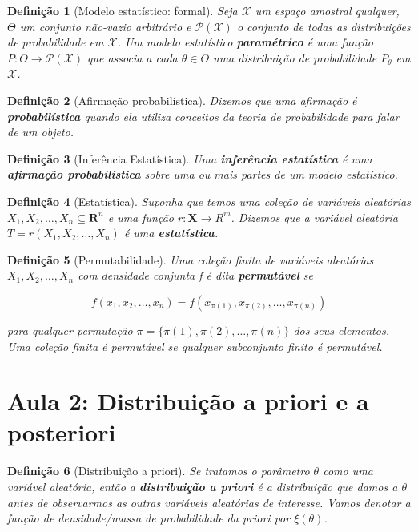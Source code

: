 \documentclass{article}
\newtheorem{definition}{Definição}
\begin{document}
\begin{definition}[Modelo estatístico: formal]
Seja $\mathcal{X}$ um espaço amostral qualquer, $\Theta$ um conjunto não-vazio arbitrário e $\mathcal{P(X)}$ o conjunto de todas as distribuições de probabilidade em $\mathcal{X}$. Um modelo estatístico \textbf{paramétrico} é uma função $P: \Theta \rightarrow \mathcal{P(X)}$ que associa a cada $\theta \in \Theta$ uma distribuição de probabilidade $P_\theta$ em $\mathcal{X}$.
\end{definition}

\begin{definition}[Afirmação probabilística]
Dizemos que uma afirmação é \textbf{probabilística} quando ela utiliza conceitos da teoria de probabilidade para falar de um objeto.
\end{definition}

\begin{definition}[Inferência Estatística]
Uma \textbf{inferência estatística} é uma \textbf{afirmação probabilística} sobre uma ou mais partes de um modelo estatístico.
\end{definition}

\begin{definition}[Estatística]
Suponha que temos uma coleção de variáveis aleatórias $X_1, X_2, \ldots, X_n \subseteq \mathbf{R}^n$ e uma função $r: \mathbf{X} \rightarrow R^m$. Dizemos que a variável aleatória $T = r(X_1, X_2, \ldots, X_n)$ é uma \textbf{estatística}.
\end{definition}

\begin{definition}[Permutabilidade]
Uma coleção finita de variáveis aleatórias $X_1, X_2, \ldots, X_n$ com densidade conjunta f é dita \textbf{permutável} se

\begin{equation}
f(x_1, x_2, \ldots, x_n) = f(x_{\pi(1)}, x_{\pi(2)}, \ldots, x_{\pi(n)})
\end{equation}

para qualquer permutação $\pi = \{\pi(1), \pi(2), \ldots, \pi(n)\}$ dos seus elementos. Uma coleção finita é permutável se qualquer subconjunto finito é permutável.
\end{definition}

\section*{Aula 2:  Distribuição a priori e a posteriori}
\label{s2}
\begin{definition}[Distribuição a priori]
Se tratamos o parâmetro $\theta$ como uma variável aleatória, então a \textbf{distribuição a priori} é a distribuição que damos a $\theta$ antes de observarmos as outras variáveis aleatórias de interesse. Vamos denotar a função de densidade/massa de probabilidade da priori por $\xi(\theta)$.
\end{definition}
\end{document}
